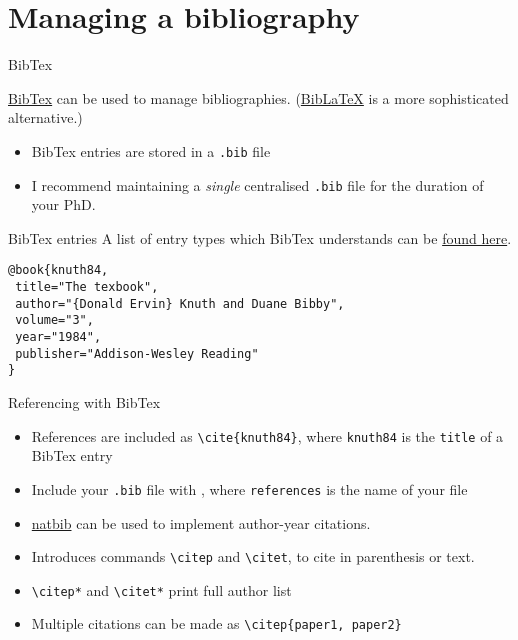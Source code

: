 \section{Managing a bibliography}

\begin{frame}[fragile]{BibTex}

\href{https://ctan.org/pkg/bibtex?lang=en}{BibTex}
can be used to manage bibliographies.
(\href{https://ctan.org/pkg/biblatex?lang=en}{BibLaTeX}
is a more sophisticated alternative.)

\begin{itemize}
  \item BibTex entries are stored in a \texttt{.bib} file
  \item I recommend maintaining a \textsl{single} centralised \texttt{.bib} file
	for the duration of your PhD.
\end{itemize}

\end{frame}

\begin{frame}[fragile]{BibTex entries}
A list of entry types which BibTex understands can be
\href{http://bib-it.sourceforge.net/help/fieldsAndEntryTypes.php#Entries}%
{found here}.
\begin{lstlisting}
@book{knuth84,
 title="The texbook",
 author="{Donald Ervin} Knuth and Duane Bibby",
 volume="3",
 year="1984",
 publisher="Addison-Wesley Reading"
}
\end{lstlisting}

\end{frame}

\begin{frame}[fragile]{Referencing with BibTex}
\begin{itemize}
\item References are included as \lstinline|\cite{knuth84}|, where
	\texttt{knuth84} is the \lstinline|title| of a BibTex entry

\item Include your \texttt{.bib} file with \lstinline||,
	where \texttt{references} is the name of your file
\end{itemize}
\end{frame}


\begin{frame}[fragile]{}
\begin{itemize}
\item \href{https://ctan.org/pkg/natbib?lang=en}{natbib} can be used to
	implement author-year citations.
\item Introduces commands \lstinline|\citep| and \lstinline|\citet|, to cite in
	parenthesis or text.
\item \lstinline|\citep*| and \lstinline|\citet*| print full author list
\item Multiple citations can be made as \lstinline|\citep{paper1, paper2}|
  \end{itemize}
\end{frame}

